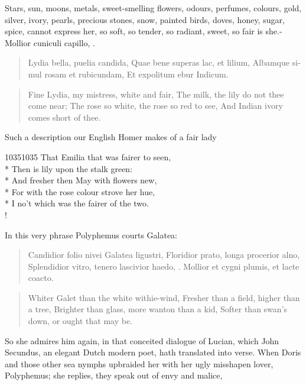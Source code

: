 Stars, sun, moons, metals, sweet-smelling flowers, odours, perfumes,
colours, gold, silver, ivory, pearls, precious stones, snow, painted
birds, doves, honey, sugar, spice, cannot express her, so soft,
so tender, so radiant, sweet, so fair is she.-Mollior cuniculi capillo,
\etc{}.

\begin{latin}
\begin{verse}
Lydia bella, puelia candida,
Quae bene superas lac, et lilium,
Albamque simul rosam et rubicundam,
Et expolitum ebur Indicum.
\end{verse}
\end{latin}
\translationrule%
\begin{verse}%
Fine Lydia, my mistress, white and fair,
The milk, the lily do not thee come near;
The rose so white, the rose so red to see,
And Indian ivory comes short of thee.
\end{verse}%

Such a description our English Homer makes of a fair lady
%
{\gothfont%
\begin{versewithlinenos}{2}{1035}{1035}%
That Emilia that was fairer to seen,\\*
Then is lily upon the stalk green:\\*
And fresher then May with flowers new,\\*
For with the rose colour strove her hue,\\*
I no't which was the fairer of the two.\\!
\end{versewithlinenos}%
}%

In this very phrase Polyphemus courts Galatea:

\begin{latin}
\begin{verse}
Candidior folio nivei Galatea ligustri,
Floridior prato, longa procerior alno,
Splendidior vitro, tenero lascivior haedo, \etc{}.
Mollior et cygni plumis, et lacte coacto.
\end{verse}
\end{latin}
\translationrule%
\begin{verse}%
Whiter Galet than the white withie-wind,
Fresher than a field, higher than a tree,
Brighter than glass, more wanton than a kid,
Softer than swan's down, or ought that may be.
\end{verse}%

So she admires him again, in that conceited dialogue of Lucian, which
John Secundus, an elegant Dutch modern poet, hath translated into
verse. When Doris and those other sea nymphs upbraided her with her
ugly misshapen lover, Polyphemus; she replies, they speak out of envy
and malice,

